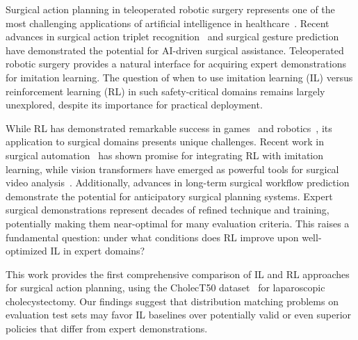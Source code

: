 \documentclass[runningheads]{llncs}
\begin{document}
Surgical action planning in teleoperated robotic surgery represents one of the most challenging applications of artificial intelligence in healthcare~\cite{nwoye2022cholect50,nwoye2020recognition}. Recent advances in surgical action triplet recognition~\cite{nwoye2023cholectriplet2021} and surgical gesture prediction~\cite{shi2022recognition,weerasinghe2024multimodal} have demonstrated the potential for AI-driven surgical assistance. Teleoperated robotic surgery provides a natural interface for acquiring expert demonstrations for imitation learning. The question of when to use imitation learning (IL) versus reinforcement learning (RL) in such safety-critical domains remains largely unexplored, despite its importance for practical deployment.

While RL has demonstrated remarkable success in games~\cite{mnih2015human} and robotics~\cite{levine2016end}, its application to surgical domains presents unique challenges. Recent work in surgical automation~\cite{liu2024surgical} has shown promise for integrating RL with imitation learning, while vision transformers have emerged as powerful tools for surgical video analysis~\cite{wagner2023vision,liu2023skit,liu2025lovit}. Additionally, advances in long-term surgical workflow prediction~\cite{boels2025swag} demonstrate the potential for anticipatory surgical planning systems. Expert surgical demonstrations represent decades of refined technique and training, potentially making them near-optimal for many evaluation criteria. This raises a fundamental question: under what conditions does RL improve upon well-optimized IL in expert domains?

This work provides the first comprehensive comparison of IL and RL approaches for surgical action planning, using the CholecT50 dataset~\cite{nwoye2022cholect50} for laparoscopic cholecystectomy. Our findings suggest that distribution matching problems on evaluation test sets may favor IL baselines over potentially valid or even superior policies that differ from expert demonstrations.
\end{document}
